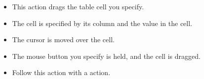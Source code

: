 \begin{itemize}
\item This action drags the table cell you specify.
\item The cell is specified by its column and the value in the cell. 
\item The cursor is moved over the cell.
\item The mouse button you specify is held, and the cell is dragged. 
\item Follow this action with a  action.
\end{itemize}


